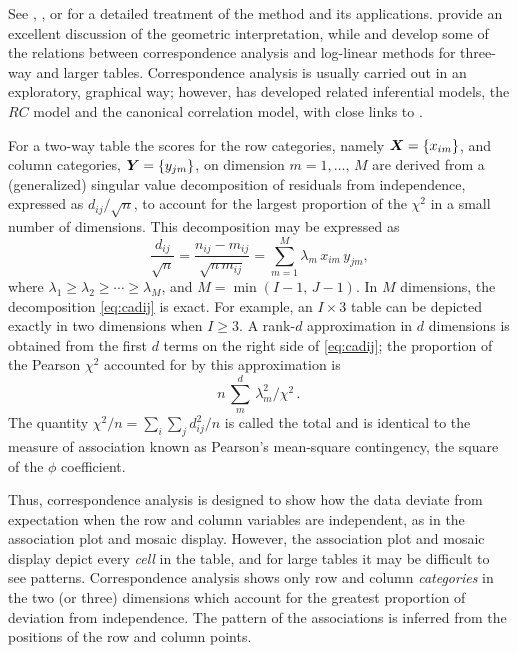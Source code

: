 See \citet{Greenacre:84}, \citet{Nishisato:80},
or \citet{Gifi:81,Lebart-etal:77,Lebart-etal:84}
for a detailed treatment of the method and its applications.
\citet{GreenacreHastie:87} provide an excellent discussion of
the geometric interpretation,
while \citet{HeijdenLeeuw:85} and \citet{Heijden-etal:89}
develop some of the relations between correspondence analysis
and log-linear methods for three-way and larger tables.
Correspondence analysis is usually carried out in an exploratory,
graphical way; however,
\citet{Goodman:81,Goodman:85,Goodman:86} has developed related inferential models, the $RC$ model and
the canonical correlation model, with close links to \CA.

For a two-way table the scores for the row categories, namely
\(\bm{X} = \{x_{im}\}\), and column categories, \(\bm{Y} = \{y_{jm}\}\), on dimension \(m = 1,
\dots , \,  M\) are derived from a (generalized) singular value decomposition of
residuals from independence, expressed as \(d_{ij} /  \sqrt n\), to
account for the largest proportion of the \(\chi^2\) in a small
number of dimensions.  This decomposition may be expressed as
%
\begin{equation} \label{eq:cadij}
  \frac{d_{ij}}{\sqrt{n}} = 
  \frac{n_{ij} - m_{ij}} {\sqrt {n \,  m_{ij}}} =
  \sum_{m=1}^M  \lambda_m \,  x_{im} \,  y_{jm}
  \comma
\end{equation}
where \(\lambda_1 \geq \lambda_2 \geq \cdots \geq \lambda_M\), and \(M
=  \min ( I-1 , \,  J-1 )\).  In \(M\) dimensions, the decomposition
\eqref{eq:cadij} is exact.
For example, an \(I \times 3\) table can be depicted exactly
in two dimensions when $I \ge 3$.  A rank-\(d\) approximation in \(d\) dimensions is
obtained from the first \(d\) terms on the right side of \eqref{eq:cadij};
the proportion of the Pearson \(\chi^2\) accounted for by this approximation is
\begin{equation*}
 n \,  \sum_m^d { \,  \lambda_m^2 } \big/  \chi^2
 \period
\end{equation*}
The quantity $\chi^2 /n = \sum_i \sum_j d_{ij}^2  / n$ is called
the total  and is identical to the measure of
association known as Pearson's mean-square contingency, the
square of the $\phi$ coefficient.

Thus, correspondence analysis is designed to show how the data
deviate from expectation when the row and column variables are
independent, as in the association plot and mosaic display.  However,
the association plot and mosaic display depict every \emph{cell} in
the table, and for large tables it may be difficult to see patterns.
Correspondence analysis shows only row and column \emph{categories} in
the two (or three) dimensions which account for the greatest
proportion of deviation from independence.
The pattern of the associations is inferred from the positions of the
row and column points.


